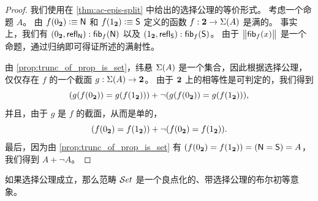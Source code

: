 \begin{proof}
我们使用在 \cref{thm:ac-epis-split} 中给出的选择公理的等价形式。
考虑一个命题 $A$。
由 $f({0_{\mathbf{2}}}) \vcentcolon\equiv \mathsf{N}$ 和 $f({1_{\mathbf{2}}}) \vcentcolon\equiv \mathsf{S}$ 定义的函数 $f:\mathbf{2}\to\Sigma(A)$ 是满的。
事实上，我们有
${\mathopen{}({0_{\mathbf{2}}},\mathsf{refl}_{\mathsf{N}})\mathclose{}} : {\mathsf{fib}}_{f}(\mathsf{N})$
以及 ${\mathopen{}({1_{\mathbf{2}}},\mathsf{refl}_{\mathsf{S}})\mathclose{}} :{\mathsf{fib}}_{f}(\mathsf{S})$。
由于 $\bigl\Vert {\mathsf{fib}}_{f}(x)\bigr\Vert_{}$ 是一个命题，通过归纳即可得证所述的满射性。

由 \cref{prop:trunc_of_prop_is_set}，纬悬 $\Sigma(A)$ 是一个集合，因此根据选择公理，仅仅存在 $f$ 的一个截面 $g: \Sigma(A) \to \mathbf{2}$。
由于 $\mathbf{2}$ 上的相等性是可判定的，我们得到
\begin{equation*}
 (g(f({0_{\mathbf{2}}}))= g(f({1_{\mathbf{2}}}))) +
 \lnot (g(f({0_{\mathbf{2}}}))= g(f({1_{\mathbf{2}}}))),
\end{equation*}
并且，由于 $g$ 是 $f$ 的截面，从而是单的，
\begin{equation*}
(f({0_{\mathbf{2}}}) = f({1_{\mathbf{2}}})) +
\lnot (f({0_{\mathbf{2}}}) = f({1_{\mathbf{2}}})).
\end{equation*}
最后，因为由 \cref{prop:trunc_of_prop_is_set} 有 $(f({0_{\mathbf{2}}})=f({1_{\mathbf{2}}})) = (\mathsf{N}=\mathsf{S}) = A$，我们得到 $A+\neg A$。
\end{proof}






\begin{thm}\label{thm:ETCS}
  如果选择公理成立，那么范畴 $\mathcal{S}et$ 是一个良点化的、带选择公理的布尔初等意象。
\end{thm}

